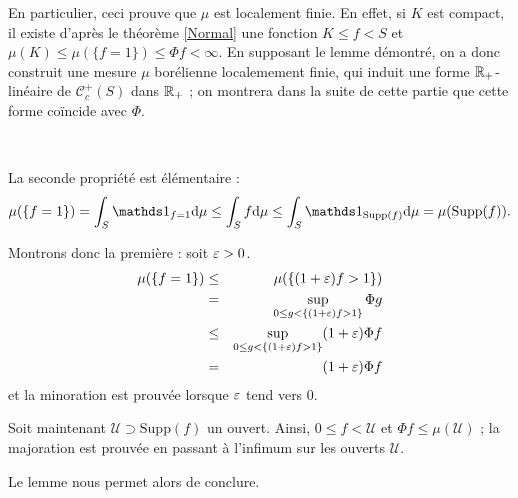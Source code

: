 \documentclass{article}
\begin{document}
En particulier, ceci prouve que $\mu$ est localement finie. En effet, si $K$ est compact, il existe d'après le théorème \ref{Normal} une fonction $K\leq f<S$ et $\mu(K)\leq\mu(\{f=1\})\leq\Phi f<\infty$. En supposant le lemme démontré, on a donc construit une mesure $\mu$ borélienne localemement finie, qui induit une forme $\mathbb{R}_+$-linéaire de $\mathcal C_c^+(S)$ dans $\mathbb{R}_+$ ; on montrera dans la suite de cette partie que cette forme coïncide avec $\Phi$.

\begin{Dem}~

La seconde propriété est élémentaire :
$$\mu(\left\{f=1\right\})=\int_S\Ind{f=1}\dif\mu\leq \int_Sf\dif\mu\leq\int_S\Ind{\mathrm{Supp}(f)}\dif\mu=\mu(\mathrm{Supp}(f))\text.$$

Montrons donc la première : soit $\varepsilon>0$.
\begin{eqnarray*}
\mu(\left\{f=1\right\})
  &\leq& \mu(\left\{(1+\varepsilon)f>1\right\})\\
  &   =& \sup_{0\leq g<\left\{(1+\varepsilon)f>1\right\}}\Phi g\\
  &\leq& \sup_{0\leq g<\left\{(1+\varepsilon)f>1\right\}}(1+\varepsilon)\Phi f\\
  &   =& (1+\varepsilon)\Phi f
\end{eqnarray*}
et la minoration est prouvée lorsque $\varepsilon$ tend vers $0$.

Soit maintenant $\mathcal U\supset\mathrm{Supp}(f)$ un ouvert. Ainsi, $0\leq f<\mathcal U$ et $\Phi f\leq\mu(\mathcal U)$ ; la majoration est prouvée en passant à l'infimum sur les ouverts $\mathcal U$.
\end{Dem}

Le lemme nous permet alors de conclure.
\end{document}
